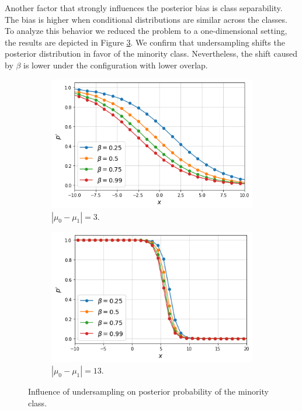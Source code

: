 \documentclass[conference]{IEEEtran}
\begin{document}
		Another factor that strongly influences the posterior bias is class separability. The bias is higher when conditional distributions are similar across the classes\cite{undersampling_posterior}. To analyze this behavior we reduced the problem to a one-dimensional setting, the results are depicted in Figure \ref{fig:Undersampling_posterior}. We confirm that undersampling shifts the posterior distribution in favor of the minority class. Nevertheless, the shift caused by $\beta$ is lower under the configuration with lower overlap.

			\begin{figure}[h]
			     \centering
			     \begin{subfigure}[h]{0.24\textwidth}
			         \centering
			         \includegraphics[width=\textwidth]{Undersampling_PosteriorBias}
			         \caption{$|\mu_0 - \mu_1|=3$.}
			         \label{fig:Undersampling_PosteriorBias}
			     \end{subfigure}
			     \hfill
			     \begin{subfigure}[h]{0.24\textwidth}
			         \centering
			         \includegraphics[width=\textwidth]{Undersampling_PosteriorBias_Separated}
			         \caption{$|\mu_0 - \mu_1|=13$.}
			         \label{fig:Undersampling_2D_UndersampledDataset}
			     \end{subfigure}
			        \caption{Influence of undersampling on posterior probability of the minority class.}
			        \label{fig:Undersampling_posterior}
			\end{figure}
		
\end{document}
